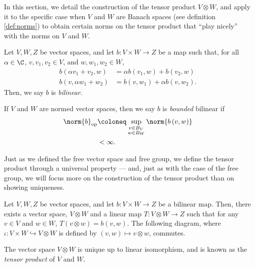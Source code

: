 In this section, we detail the construction of the tensor product $V\otimes W$, and apply it to the specific case when $V$ and $W$ are Banach spaces (see definition \ref{def:norms}) to obtain certain norms on the tensor product that ``play nicely'' with the norms on $V$ and $W$.
\begin{definition}\label{def:bilinear_map}
  Let $V,W,Z$ be vector spaces, and let $b\colon V\times W\rightarrow Z$ be a map such that, for all $\alpha\in \C$, $v,v_1,v_2\in V$, and $w,w_1,w_2\in W$,
  \begin{align*}
    b\left( \alpha v_1 + v_2,w \right) &= \alpha b\left( v_1,w \right) + b\left( v_2,w \right)\\
    b\left( v,\alpha w_1 + w_2 \right) &= b\left( v,w_1 \right) + \alpha b\left( v,w_2 \right).
  \end{align*}
  Then, we say $b$ is \textit{bilinear}.\newline

  If $V$ and $W$ are normed vector spaces, then we say $b$ is \textit{bounded} bilinear if
  \begin{align*}
    \norm{b}_{\op} &\coloneq \sup_{\substack{v\in B_{V}\\w\in B_{W}}}\norm{b\left( v,w \right)}\\
                   &< \infty.
  \end{align*}
\end{definition}
Just as we defined the free vector space and free group, we define the tensor product through a universal property --- and, just as with the case of the free group, we will focus more on the construction of the tensor product than on showing uniqueness.
\begin{theorem}\label{thm:tensor_product_existence}
  Let $V,W,Z$ be vector spaces, and let $b\colon V\times W \rightarrow Z$ be a bilinear map. Then, there exists a vector space, $V\otimes W$ and a linear map $T\colon V\otimes W \rightarrow Z$ such that for any $v\in V$ and $w\in W$, $T\left( v\otimes w \right) = b\left( v,w \right)$. The following diagram, where $\iota\colon V\times W \hookrightarrow V\otimes W$ is defined by $\left( v,w \right)\mapsto v\otimes w$, commutes.
  \begin{center}
  \end{center}
  The vector space $V\otimes W$ is unique up to linear isomorphism, and is known as the \textit{tensor product} of $V$ and $W$.
\end{theorem}
